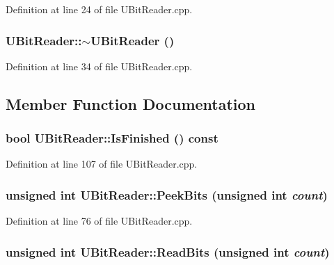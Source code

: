 Definition at line 24 of file UBitReader.cpp.\hypertarget{class_u_bit_reader_b9498a7895fb9993fb7ec5ac6a533dc2}{
\subsubsection[{$\sim$UBitReader}]{\setlength{\rightskip}{0pt plus 5cm}UBitReader::$\sim$UBitReader ()}}
\label{class_u_bit_reader_b9498a7895fb9993fb7ec5ac6a533dc2}




Definition at line 34 of file UBitReader.cpp.

\subsection{Member Function Documentation}
\hypertarget{class_u_bit_reader_c16aa31ff853ab9423122d02e6e6e451}{
\subsubsection[{IsFinished}]{\setlength{\rightskip}{0pt plus 5cm}bool UBitReader::IsFinished () const}}
\label{class_u_bit_reader_c16aa31ff853ab9423122d02e6e6e451}




Definition at line 107 of file UBitReader.cpp.\hypertarget{class_u_bit_reader_4744716f48876dde16fc77d995874dfe}{
\subsubsection[{PeekBits}]{\setlength{\rightskip}{0pt plus 5cm}unsigned int UBitReader::PeekBits (unsigned int {\em count})}}
\label{class_u_bit_reader_4744716f48876dde16fc77d995874dfe}




Definition at line 76 of file UBitReader.cpp.\hypertarget{class_u_bit_reader_0de30069dca391af5444904cb7c6da09}{
\subsubsection[{ReadBits}]{\setlength{\rightskip}{0pt plus 5cm}unsigned int UBitReader::ReadBits (unsigned int {\em count})}}
\label{class_u_bit_reader_0de30069dca391af5444904cb7c6da09}




